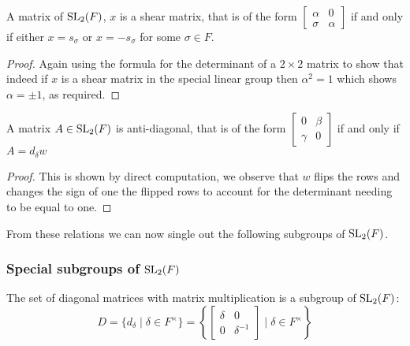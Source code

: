 \begin{corollary}
    \label{SpecialLinearGroup.fin_two_shear_iff}
    \leanok
    A matrix of $\operatorname{SL}_2(F)$, $x$ is a shear matrix, that is of the form $\begin{bmatrix}
        \alpha & 0\\
        \sigma & \alpha
    \end{bmatrix}$ if and only if either $x = s_\sigma$ or $x = - s_\sigma$ for some $\sigma \in F$.
\end{corollary}
\begin{proof}
\leanok
Again using the formula for the determinant of a $2 \times 2$ matrix to show that indeed if $x$ is a shear matrix in the special linear group 
then $\alpha^2 = 1$ which shows $\alpha = \pm 1$, as required.
\end{proof}


\begin{corollary}
    \label{SpecialLinearGroup.fin_two_antidiagonal_iff}
    \leanok
    A matrix $A \in \operatorname{SL}_2(F)$ is anti-diagonal, that is of the form $\begin{bmatrix}
        0 & \beta\\
        \gamma & 0
    \end{bmatrix}$ if and only if $A = d_\delta w$
\end{corollary}
\begin{proof}
\leanok
This is shown by direct computation, we observe that $w$ flips the rows and changes the sign of one the flipped rows to account for the determinant needing to be equal to one.
\end{proof}


From these relations we can now single out the following subgroups of $\operatorname{SL}_2(F)$.

\subsubsection{Special subgroups of $\operatorname{SL}_2(F)$}

\begin{definition}
\label{SpecialSubgroups.D}
\leanok
    The set of diagonal matrices with matrix multiplication is a subgroup of $\operatorname{SL}_2(F)$: 
    \[
    D = \{d_\delta \; | \; \delta \in F^\times \} = \left\{ \begin{bmatrix}\delta & 0\\ 0 & \delta^{-1}\end{bmatrix} \; | \; \delta \in F^\times \right\}
    \]
\end{definition}



